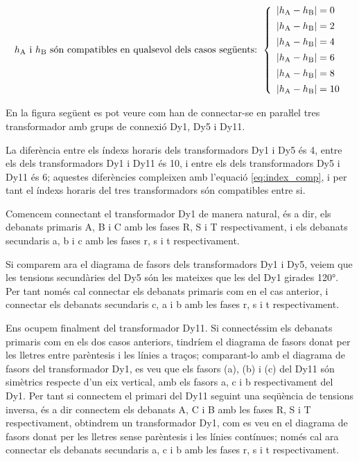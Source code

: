 \begin{equation}
    h_\mathrm{A} \text{ i } h_\mathrm{B} \text{ són compatibles en qualsevol dels casos següents: }
    \left\{
        \begin{array}{l}
           |h_\mathrm{A} - h_\mathrm{B}| = 0 \\[1ex]
           |h_\mathrm{A} - h_\mathrm{B}| = 2 \\[1ex]
           |h_\mathrm{A} - h_\mathrm{B}| = 4 \\[1ex]
           |h_\mathrm{A} - h_\mathrm{B}| = 6 \\[1ex]
           |h_\mathrm{A} - h_\mathrm{B}| = 8 \\[1ex]
           |h_\mathrm{A} - h_\mathrm{B}| = 10
        \end{array}
    \right.
    \label{eq:index_comp}
\end{equation}

\begin{exemple}
    En la figura següent es pot veure com han de connectar-se en paraŀlel tres transformador amb grups de connexió Dy1, Dy5 i Dy11.

      La diferència entre els índexs horaris dels transformadors Dy1 i Dy5 és 4, entre els dels transformadors Dy1 i Dy11 és 10, i entre els dels transformadors Dy5 i Dy11 és 6; aquestes diferències compleixen amb l'equació \eqref{eq:index_comp}, i per tant el índexs horaris del tres transformadors són compatibles entre si.


    Comencem connectant el  transformador Dy1 de manera natural, és a dir, els debanats primaris A, B i C amb les fases R, S i T respectivament, i els debanats secundaris a, b i c amb les fases r, s i t respectivament.

   \begin{center}
        
    \end{center}

    Si comparem ara el diagrama de fasors dels transformadors Dy1 i Dy5, veiem que les tensions secundàries del Dy5 són les mateixes que les del Dy1 girades \ang{120}. Per tant només  cal connectar els debanats primaris com en el cas anterior, i connectar els debanats secundaris c, a i b amb les fases r, s i t respectivament.


    Ens ocupem finalment del transformador Dy11. Si connectéssim els debanats primaris com en els dos casos anteriors, tindríem el diagrama de fasors donat per les lletres entre parèntesis i les línies a traços; comparant-lo amb el diagrama de fasors del transformador Dy1, es veu que els fasors (a), (b) i (c) del Dy11 són simètrics respecte d'un eix vertical, amb els fasors a, c i b respectivament del Dy1. Per tant si connectem el primari del Dy11 seguint una seqüència de tensions inversa, és a dir connectem els debanats A, C i B amb les fases R, S i T respectivament, obtindrem un transformador Dy1, com es veu en el diagrama de fasors donat per les lletres sense parèntesis i les línies contínues; només cal ara connectar els debanats secundaris a, c i b amb les fases r, s i t respectivament.
\end{exemple}

